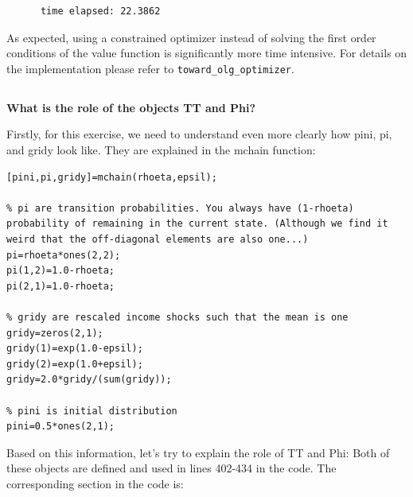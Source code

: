 \documentclass[12pt,a4paper]{article}
\begin{document}
  \begin{lstlisting}
      time elapsed: 22.3862
  \end{lstlisting}

As expected, using a constrained optimizer instead of solving the first order conditions of the value function is significantly more time intensive.
For details on the implementation please refer to \texttt{toward\_olg\_optimizer}.

\subsection{}

\textbf{What is the role of the objects TT and Phi?}

Firstly, for this exercise, we need to understand even more clearly how pini, pi, and gridy look like. They are explained in the mchain function:

\begin{lstlisting}[frame=single]
[pini,pi,gridy]=mchain(rhoeta,epsil);

% pi are transition probabilities. You always have (1-rhoeta) probability of remaining in the current state. (Although we find it weird that the off-diagonal elements are also one...)
pi=rhoeta*ones(2,2);
pi(1,2)=1.0-rhoeta;
pi(2,1)=1.0-rhoeta;

% gridy are rescaled income shocks such that the mean is one
gridy=zeros(2,1);
gridy(1)=exp(1.0-epsil);
gridy(2)=exp(1.0+epsil);
gridy=2.0*gridy/(sum(gridy));

% pini is initial distribution
pini=0.5*ones(2,1);
\end{lstlisting}

Based on this information, let's try to explain the role of TT and Phi: Both of these objects are defined and used in lines 402-434 in the code. The corresponding section in the code is:
\end{document}
